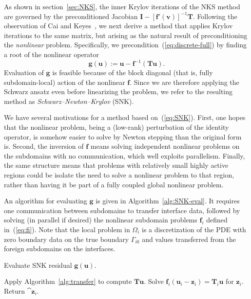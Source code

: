 As shown in section~\ref{sec:NKS}, the inner Krylov iterations of the NKS method are governed by the preconditioned Jacobian $\bm{I} - [\bm{f}'(\bm{v})]^{-1}\bm{T}$. Following the  observation of Cai and Keyes~\cite{Cai2002}, we next derive a method that applies Krylov iterations to the same matrix, but arising as the natural result of preconditioning the \emph{nonlinear} problem. Specifically, we precondition~(\ref{eq:discrete-full}) by finding a root of the nonlinear operator
\begin{equation}
  \label{eq:SNK}
  \bm{g}(\bm{u}) := \bm{u} - \bm{f}^{-1}(\bm{T}\bm{u}).
\end{equation}
Evaluation of $\bm{g}$ is feasible because of the block diagonal (that is, fully subdomain-local) action of the nonlinear $\bm{f}$. Since we are therefore applying the Schwarz ansatz even before linearizing the problem, we refer to the resulting method as \emph{Schwarz--Newton--Krylov} (SNK). 

We have several motivations for a method based on~(\ref{eq:SNK}). First, one hopes that the nonlinear problem, being a (low-rank) perturbation of the identity operator, is somehow easier to solve by Newton stepping than the original form is. Second, the inversion of $\bm{f}$ means solving independent nonlinear problems on the subdomains with no communication, which well exploits parallelism. Finally, the same structure means that problems with relatively small highly active regions could be isolate the need to solve a nonlinear problem to that region, rather than having it be part of a fully coupled global nonlinear problem.   

An algorithm for evaluating $\bm{g}$ is given in Algorithm~\ref{alg:SNK-eval}. It requires one communication between subdomains to transfer interface data, followed by solving (in parallel if desired) the nonlinear subdomain problems $\bm{f}_i$ defined in~(\ref{eq:fi}). Note that the local problem in $\Omega_i$ is a discretization of the PDE with zero boundary data on the true boundary $\Gamma_{i0}$ and values transferred from the foreign subdomains on the interfaces.

\begin{algorithm}
  \caption{Evaluate SNK residual $\bm{g}(\bm{u})$.}
  \label{alg:SNK-eval}
  \begin{algorithmic}
    \STATE Apply Algorithm~\ref{alg:transfer} to compute $\bm{T}\bm{u}$.
    \STATE Solve $\bm{f}_i(\bm{u}_i-\bm{z}_i)=\bm{T}_i\bm{u}$ for $\bm{z}_i$.
    \ENDFOR
    \STATE Return $\cat{\bm{z}_i}$. 
  \end{algorithmic}
\end{algorithm}


